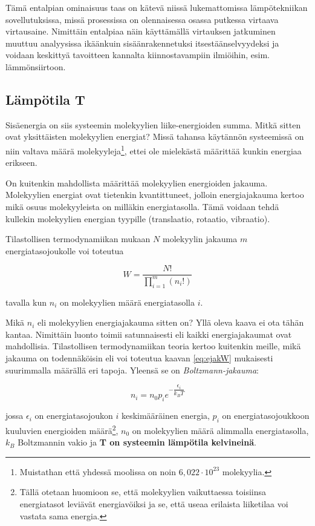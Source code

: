 \documentclass[12pt,a4paper,finnish]{book}
\begin{document}
Tämä entalpian ominaisuus taas on kätevä niissä lukemattomissa lämpötekniikan sovellutuksissa, missä prosessissa on 
olennaisessa osassa putkessa virtaava virtausaine. Nimittäin entalpiaa näin käyttämällä virtauksen jatkuminen muuttuu 
analyysissa ikäänkuin sisäänrakennetuksi itsestäänselvyydeksi ja voidaan keskittyä tavoitteen kannalta kiinnostavampiin 
ilmiöihin, esim. lämmönsiirtoon.

\subsection{Lämpötila T} \label{sssection:T} %

Sisäenergia on siis systeemin molekyylien liike-energioiden summa. Mitkä sitten ovat yksittäisten molekyylien energiat? 
Missä tahansa käytännön systeemissä on niin valtava määrä molekyyleja\footnote{Muistathan että yhdessä moolissa on 
noin $6,022\cdot10^{23}$ molekyylia.}, ettei ole mielekästä määrittää kunkin energiaa erikseen.

On kuitenkin mahdollista määrittää molekyylien energioiden jakauma. Molekyylien energiat ovat tietenkin kvantittuneet, 
jolloin energiajakauma kertoo mikä osuus molekyyleista on milläkin energiatasolla. Tämä voidaan tehdä kullekin molekyylien 
energian tyypille (translaatio, rotaatio, vibraatio).

Tilastollisen termodynamiikan mukaan $N$ molekyylin jakauma $m$ energiatasojoukolle voi toteutua

\begin{equation}
\label{eq:ejakW}
 W = \frac{N!}{\prod_{i=1}^m(n_i!)}
\end{equation}

tavalla kun $n_i$ on molekyylien määrä energiatasolla $i$.

Mikä $n_i$ eli molekyylien energiajakauma sitten on? Yllä oleva kaava ei ota tähän kantaa. 
Nimittäin luonto toimii satunnaisesti eli kaikki energiajakaumat ovat mahdollisia. Tilastollisen termodynamiikan 
teoria kertoo kuitenkin meille, mikä jakauma on todennäköisin eli voi toteutua kaavan \ref{eq:ejakW} mukaisesti 
suurimmalla määrällä eri tapoja. Yleensä se on \textit{Boltzmann-jakauma}:

\begin{equation}
\label{eq:boltzmann}
 n_i = n_0p_ie^{-\dfrac{\epsilon_i}{k_BT}}
\end{equation}

jossa $\epsilon_i$ on energiatasojoukon $i$ keskimääräinen energia, $p_i$ on energiatasojoukkoon kuuluvien energioiden 
määrä\footnote{Tällä otetaan huomioon se, että molekyylien vaikuttaessa toisiinsa energiatasot leviävät energiavöiksi ja 
se, että useaa erilaista liiketilaa voi vastata sama energia.}, $n_0$ on molekyylien määrä alimmalla 
energiatasolla, $k_B$ Boltzmannin vakio ja \textbf{T on systeemin lämpötila kelvineinä}.
\end{document}
